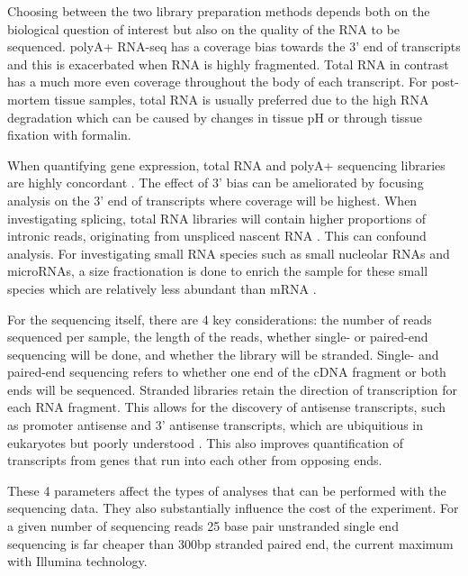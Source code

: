 Choosing between the two library preparation methods depends both on the biological question of interest but also on the quality of the RNA to be sequenced.
polyA+ RNA-seq has a coverage bias towards the 3' end of transcripts and this is exacerbated when RNA is highly fragmented.  
Total RNA in contrast has a much more even coverage throughout the body of each transcript.
For post-mortem tissue samples, total RNA is usually preferred due to the high RNA degradation which can be caused by changes in tissue pH or through tissue fixation with formalin.

When quantifying gene expression, total RNA and polyA+ sequencing libraries are highly concordant \citep{Cui2010,Zhao2018}. 
The effect of 3' bias can be ameliorated by focusing analysis on the 3' end of transcripts where coverage will be highest. 
When investigating splicing, total RNA libraries will contain higher proportions of intronic reads, originating from unspliced nascent RNA \citep{Ameur2011}.
This can confound analysis. 
For investigating small RNA species such as small nucleolar RNAs and microRNAs, a size fractionation is done to enrich the sample for these small species which are relatively less abundant than mRNA .

For the sequencing itself, there are 4 key considerations: the number of reads sequenced per sample, the length of the reads, whether single- or paired-end sequencing will be done, and whether the library will be stranded.
Single- and paired-end sequencing refers to whether one end of the cDNA fragment or both ends will be sequenced.
Stranded libraries retain the direction of transcription for each RNA fragment. 
This allows for the discovery of antisense transcripts, such as promoter antisense and 3' antisense transcripts, which are ubiquitious in eukaryotes but poorly understood \citep{Lavorgna2004}.
This also improves quantification of transcripts from genes that run into each other from opposing ends. 

These 4 parameters affect the types of analyses that can be performed with the sequencing data.
They also substantially influence the cost of the experiment.
For a given number of sequencing reads 25 base pair unstranded single end sequencing is far cheaper than 300bp stranded paired end, the current maximum with Illumina technology. 

